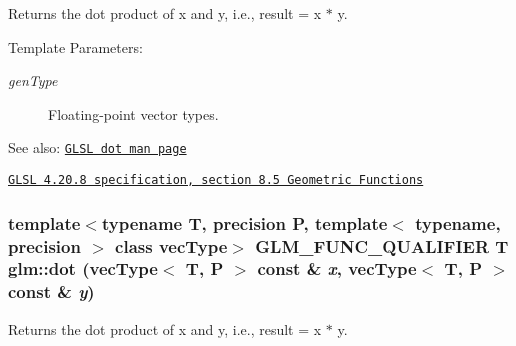 Returns the dot product of x and y, i.e., result = x $\ast$ y.

\begin{Desc}
\item[Template Parameters:]
\begin{description}
\item[{\em genType}]Floating-point vector types.\end{description}
\end{Desc}
\begin{Desc}
\item[See also:]\href{http://www.opengl.org/sdk/docs/manglsl/xhtml/dot.xml}{\tt GLSL dot man page} 

\href{http://www.opengl.org/registry/doc/GLSLangSpec.4.20.8.pdf}{\tt GLSL 4.20.8 specification, section 8.5 Geometric Functions} \end{Desc}
\hypertarget{group__core__func__geometric_gc64a3b29d01336161a668d328cac97eb}{
\subsubsection[dot]{\setlength{\rightskip}{0pt plus 5cm}template$<$typename T, precision P, template$<$ typename, precision $>$ class vecType$>$ GLM\_\-FUNC\_\-QUALIFIER T glm::dot (vecType$<$ T, P $>$ const \& {\em x}, \/  vecType$<$ T, P $>$ const \& {\em y})}}
\label{group__core__func__geometric_gc64a3b29d01336161a668d328cac97eb}


Returns the dot product of x and y, i.e., result = x $\ast$ y.

